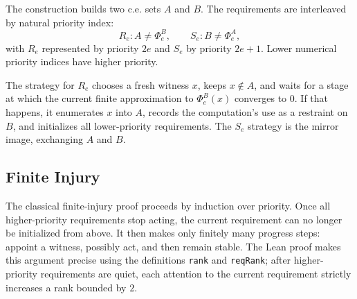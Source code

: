 The construction builds two c.e. sets \(A\) and \(B\).  The requirements are
interleaved by natural priority index:
\[
  R_e : A \neq \Phi_e^B,\qquad
  S_e : B \neq \Phi_e^A,
\]
with \(R_e\) represented by priority \(2e\) and \(S_e\) by priority
\(2e+1\).  Lower numerical priority indices have higher priority.

The strategy for \(R_e\) chooses a fresh witness \(x\), keeps \(x\notin A\),
and waits for a stage at which the current finite approximation to
\(\Phi_e^B(x)\) converges to \(0\).  If that happens, it enumerates \(x\)
into \(A\), records the computation's use as a restraint on \(B\), and
initializes all lower-priority requirements.  The \(S_e\) strategy is the
mirror image, exchanging \(A\) and \(B\).

\subsection{Finite Injury}

The classical finite-injury proof proceeds by induction over priority.
Once all higher-priority requirements stop acting, the current requirement
can no longer be initialized from above.  It then makes only finitely many
progress steps: appoint a witness, possibly act, and then remain stable.
The Lean proof makes this argument precise using the definitions
\texttt{rank} and \texttt{reqRank}; after higher-priority requirements are
quiet, each attention to the current requirement strictly increases a rank
bounded by \(2\).

